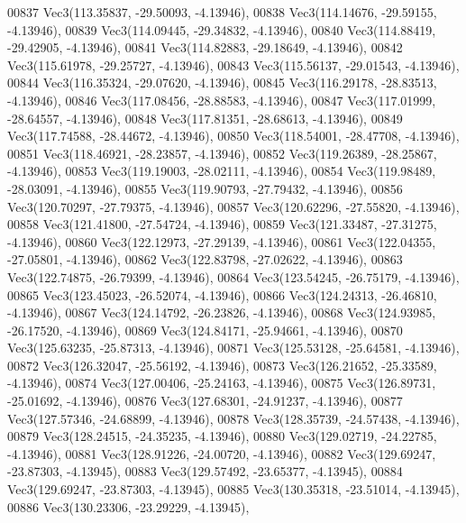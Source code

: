 \begin{DoxyCode}
00837         Vec3(113.35837, -29.50093, -4.13946),
00838         Vec3(114.14676, -29.59155, -4.13946),
00839         Vec3(114.09445, -29.34832, -4.13946),
00840         Vec3(114.88419, -29.42905, -4.13946),
00841         Vec3(114.82883, -29.18649, -4.13946),
00842         Vec3(115.61978, -29.25727, -4.13946),
00843         Vec3(115.56137, -29.01543, -4.13946),
00844         Vec3(116.35324, -29.07620, -4.13946),
00845         Vec3(116.29178, -28.83513, -4.13946),
00846         Vec3(117.08456, -28.88583, -4.13946),
00847         Vec3(117.01999, -28.64557, -4.13946),
00848         Vec3(117.81351, -28.68613, -4.13946),
00849         Vec3(117.74588, -28.44672, -4.13946),
00850         Vec3(118.54001, -28.47708, -4.13946),
00851         Vec3(118.46921, -28.23857, -4.13946),
00852         Vec3(119.26389, -28.25867, -4.13946),
00853         Vec3(119.19003, -28.02111, -4.13946),
00854         Vec3(119.98489, -28.03091, -4.13946),
00855         Vec3(119.90793, -27.79432, -4.13946),
00856         Vec3(120.70297, -27.79375, -4.13946),
00857         Vec3(120.62296, -27.55820, -4.13946),
00858         Vec3(121.41800, -27.54724, -4.13946),
00859         Vec3(121.33487, -27.31275, -4.13946),
00860         Vec3(122.12973, -27.29139, -4.13946),
00861         Vec3(122.04355, -27.05801, -4.13946),
00862         Vec3(122.83798, -27.02622, -4.13946),
00863         Vec3(122.74875, -26.79399, -4.13946),
00864         Vec3(123.54245, -26.75179, -4.13946),
00865         Vec3(123.45023, -26.52074, -4.13946),
00866         Vec3(124.24313, -26.46810, -4.13946),
00867         Vec3(124.14792, -26.23826, -4.13946),
00868         Vec3(124.93985, -26.17520, -4.13946),
00869         Vec3(124.84171, -25.94661, -4.13946),
00870         Vec3(125.63235, -25.87313, -4.13946),
00871         Vec3(125.53128, -25.64581, -4.13946),
00872         Vec3(126.32047, -25.56192, -4.13946),
00873         Vec3(126.21652, -25.33589, -4.13946),
00874         Vec3(127.00406, -25.24163, -4.13946),
00875         Vec3(126.89731, -25.01692, -4.13946),
00876         Vec3(127.68301, -24.91237, -4.13946),
00877         Vec3(127.57346, -24.68899, -4.13946),
00878         Vec3(128.35739, -24.57438, -4.13946),
00879         Vec3(128.24515, -24.35235, -4.13946),
00880         Vec3(129.02719, -24.22785, -4.13946),
00881         Vec3(128.91226, -24.00720, -4.13946),
00882         Vec3(129.69247, -23.87303, -4.13945),
00883         Vec3(129.57492, -23.65377, -4.13945),
00884         Vec3(129.69247, -23.87303, -4.13945),
00885         Vec3(130.35318, -23.51014, -4.13945),
00886         Vec3(130.23306, -23.29229, -4.13945),

\end{DoxyCode}
